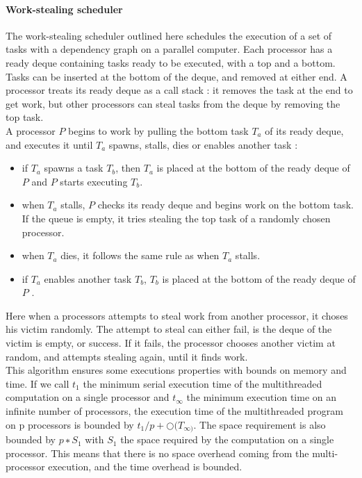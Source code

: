 \documentclass[a4paper,11pt]{article}
\begin{document}
\paragraph{Work-stealing scheduler} The work-stealing scheduler outlined here schedules the execution
of a set of tasks with a dependency graph on a parallel computer. Each processor
has a ready deque containing tasks ready to be executed, with a top and a bottom. Tasks
can be inserted at the bottom of the deque, and removed at either end. A processor treats
its ready deque as a call stack : it removes the task at the end to get work, but other
processors can steal tasks from the deque by removing the top task. \\
A processor $P$ begins to work by pulling the bottom task $T_a$ of its ready deque, and
executes it until $T_a$ spawns, stalls, dies or enables another task :
\begin{itemize}
 \item if $T_a$ spawns a task $T_b$, then $T_a$ is placed at the bottom of the ready deque of $P$
  and $P$ starts executing $T_b$.
  \item  when $T_a$ stalls, $P$ checks its ready deque and begins work on the bottom task. If
  the queue is empty, it tries stealing the top task of a randomly chosen processor.
  \item  when $T_a$ dies, it follows the same rule as when $T_a$ stalls.
  \item  if $T_a$ enables another task $T_b$, $T_b$ is placed at the bottom of the ready deque of $P$ .
\end{itemize}
Here when a processors attempts to steal work from another processor, it choses his victim
randomly. The attempt to steal can either fail, is the deque of the victim is empty, or
success. If it fails, the processor chooses another victim at random, and attempts stealing
again, until it finds work. \\
This algorithm ensures some executions properties with bounds on memory and time. If
we call $t_1$ the minimum serial execution time of the multithreaded computation on a single
processor and $t_{\infty}$ the minimum execution time on an infinite number of processors, the execution 
time of the multithreaded program on p processors is bounded by $t_1/p + \bigcirc (T_{\infty)}$.
The space requirement is also bounded by $p ∗ S_1$ with $S_1$ the space required by the computation 
on a single processor. This means that there is no space overhead coming from
the multi-processor execution, and the time overhead is bounded.
\end{document}
